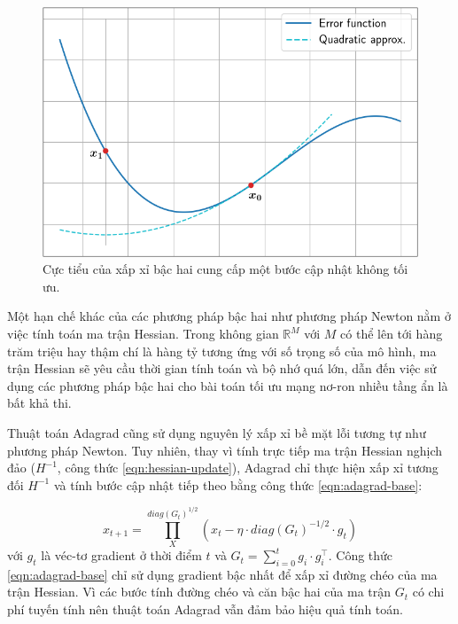 \begin{figure}
	\centering
	\includegraphics[width=150 mm]{images/hessian-osc.png}
	\caption{Cực tiểu của xấp xỉ bậc hai cung cấp một bước cập nhật không tối ưu.}
	\label{fig:newton-bad-step}
\end{figure}

Một hạn chế khác của các phương pháp bậc hai như phương pháp Newton nằm ở việc tính toán ma trận Hessian. Trong không gian $\mathbb{R}^M$ với $M$ có thể lên tới hàng trăm triệu hay thậm chí là hàng tỷ tương ứng với số trọng số của mô hình, ma trận Hessian sẽ yêu cầu thời gian tính toán và bộ nhớ quá lớn, dẫn đến việc sử dụng các phương pháp bậc hai cho bài toán tối ưu mạng nơ-ron nhiều tầng ẩn là bất khả thi.

Thuật toán Adagrad cũng sử dụng nguyên lý xấp xỉ bề mặt lỗi tương tự như phương pháp Newton. Tuy nhiên, thay vì tính trực tiếp ma trận Hessian nghịch đảo ($H^{-1}$, công thức \ref{eqn:hessian-update}), Adagrad chỉ thực hiện xấp xỉ tương đối $H^{-1}$ và tính bước cập nhật tiếp theo bằng công thức \ref{eqn:adagrad-base}:

\begin{equation}
	\label{eqn:adagrad-base}
	x_{t+1} = \prod^{diag(G_t)^{1/2}}_{X}(x_t-\eta\cdot diag(G_t)^{-1/2}\cdot g_t)
\end{equation}
với $g_t$ là véc-tơ gradient ở thời điểm $t$ và $G_t = \sum^{t}_{i=0}g_i\cdot g^{\top}_i$. Công thức \ref{eqn:adagrad-base} chỉ sử dụng gradient bậc nhất để xấp xỉ đường chéo của ma trận Hessian. Vì các bước tính đường chéo và căn bậc hai của ma trận $G_t$ có chi phí tuyến tính nên thuật toán Adagrad vẫn đảm bảo hiệu quả tính toán.

